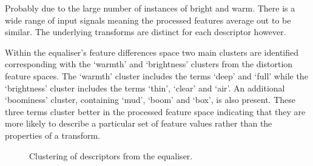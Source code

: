 		\note
		{
			Probably due to the large number of instances of bright and warm. There is a wide range of input
			signals meaning the processed features average out to be similar. The underlying transforms are
			distinct for each descriptor however.
		}
		
		Within the equaliser's feature differences space two main clusters are identified corresponding with the
		`warmth' and `brightness' clusters from the distortion feature spaces. The `warmth' cluster includes the
		terms `deep' and `full' while the `brightness' cluster includes the terms `thin', `clear' and `air'. An
		additional `boominess' cluster, containing `mud', `boom' and `box', is also present. These three terms
		cluster better in the processed feature space indicating that they are more likely to describe a particular
		set of feature values rather than the properties of a transform.

		\begin{figure}[h!]
			\centering
			\qquad
			\caption{Clustering of descriptors from the equaliser.}
			\label{fig:EqualiserClusters}
		\end{figure}
		
